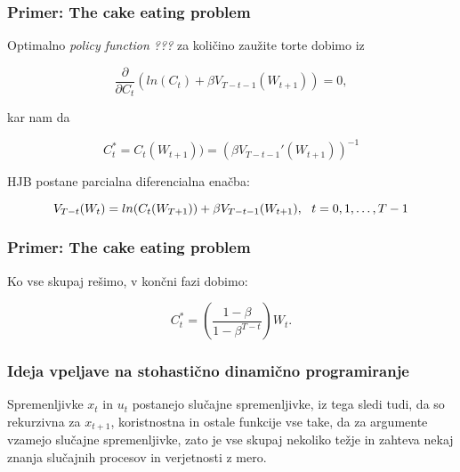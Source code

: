 \documentclass{beamer}
\begin{document}
\begin{frame}
\frametitle{Primer: The cake eating problem}
Optimalno \textit{policy function ???} za količino zaužite torte dobimo iz

\begin{equation}
\frac{\partial}{\partial C_t}(ln(C_t) +  \beta V_{T-t-1}(W_{t+1})) = 0,
\end{equation}

kar nam da

\begin{equation}
C_t^* = C_t(W_{t+1})) =  (\beta V_{T-t-1}' (W_{t+1})) ^{-1}
\end{equation} \newline

HJB postane parcialna diferencialna enačba:

\begin{equation}
V_{T-t}(W_t) = ln(C_t(W_{T+1})) + \beta V_{T-t-1}(W_{t+1}), \-\ \-\ t = 0,1, \ldots, T-1
\end{equation}

\end{frame}

\begin{frame}
\frametitle{Primer: The cake eating problem}
Ko vse skupaj rešimo, v končni fazi dobimo:

\begin{equation}
C_t^* = \left( \frac{1- \beta }{1- \beta^{T-t}} \right) W_t.
\end{equation}

\end{frame}



\begin{frame}
\frametitle{Ideja vpeljave na stohastično dinamično programiranje}

Spremenljivke $x_t$ in $u_t$ postanejo slučajne spremenljivke, iz tega sledi tudi, da so rekurzivna za $x_{t+1}$, koristnostna in ostale funkcije vse take, da za argumente vzamejo slučajne spremenljivke, zato je vse skupaj nekoliko težje in zahteva nekaj znanja slučajnih procesov in verjetnosti z mero.

\end{frame}
\end{document}

